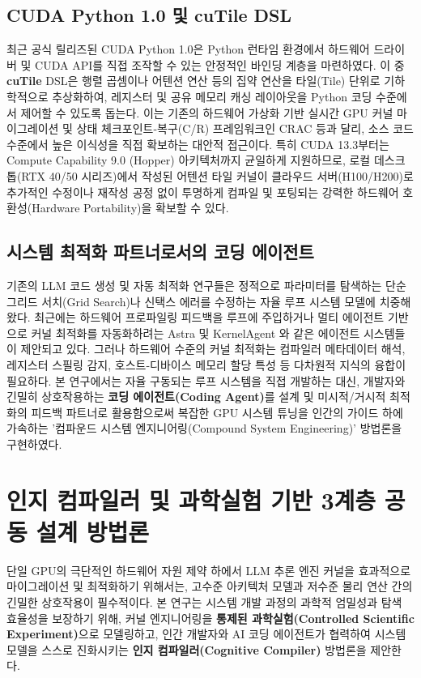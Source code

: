 \documentclass[preprint]{kcc} %
\begin{document}
\subsection{CUDA Python 1.0 및 cuTile DSL}
최근 공식 릴리즈된 CUDA Python 1.0은 Python 런타임 환경에서 하드웨어 드라이버 및 CUDA API를 직접 조작할 수 있는 안정적인 바인딩 계층을 마련하였다. 이 중 \textbf{cuTile} DSL은 행렬 곱셈이나 어텐션 연산 등의 집약 연산을 타일(Tile) 단위로 기하학적으로 추상화하여, 레지스터 및 공유 메모리 캐싱 레이아웃을 Python 코딩 수준에서 제어할 수 있도록 돕는다. 이는 기존의 하드웨어 가상화 기반 실시간 GPU 커널 마이그레이션 및 상태 체크포인트-복구(C/R) 프레임워크인 CRAC 등과 달리, 소스 코드 수준에서 높은 이식성을 직접 확보하는 대안적 접근이다. 특히 CUDA 13.3부터는 Compute Capability 9.0 (Hopper) 아키텍처까지 균일하게 지원하므로, 로컬 데스크톱(RTX 40/50 시리즈)에서 작성된 어텐션 타일 커널이 클라우드 서버(H100/H200)로 추가적인 수정이나 재작성 공정 없이 투명하게 컴파일 및 포팅되는 강력한 하드웨어 호환성(Hardware Portability)을 확보할 수 있다.

\subsection{시스템 최적화 파트너로서의 코딩 에이전트}
기존의 LLM 코드 생성 및 자동 최적화 연구들은 정적으로 파라미터를 탐색하는 단순 그리드 서치(Grid Search)나 신택스 에러를 수정하는 자율 루프 시스템 모델에 치중해 왔다. 최근에는 하드웨어 프로파일링 피드백을 루프에 주입하거나 멀티 에이전트 기반으로 커널 최적화를 자동화하려는 Astra 및 KernelAgent 와 같은 에이전트 시스템들이 제안되고 있다. 그러나 하드웨어 수준의 커널 최적화는 컴파일러 메타데이터 해석, 레지스터 스필링 감지, 호스트-디바이스 메모리 할당 특성 등 다차원적 지식의 융합이 필요하다. 본 연구에서는 자율 구동되는 루프 시스템을 직접 개발하는 대신, 개발자와 긴밀히 상호작용하는 \textbf{코딩 에이전트(Coding Agent)}를 설계 및 미시적/거시적 최적화의 피드백 파트너로 활용함으로써 복잡한 GPU 시스템 튜닝을 인간의 가이드 하에 가속하는 '컴파운드 시스템 엔지니어링(Compound System Engineering)' 방법론을 구현하였다.


\section{인지 컴파일러 및 과학실험 기반 3계층 공동 설계 방법론}
단일 GPU의 극단적인 하드웨어 자원 제약 하에서 LLM 추론 엔진 커널을 효과적으로 마이그레이션 및 최적화하기 위해서는, 고수준 아키텍처 모델과 저수준 물리 연산 간의 긴밀한 상호작용이 필수적이다. 본 연구는 시스템 개발 과정의 과학적 엄밀성과 탐색 효율성을 보장하기 위해, 커널 엔지니어링을 \textbf{통제된 과학실험(Controlled Scientific Experiment)}으로 모델링하고, 인간 개발자와 AI 코딩 에이전트가 협력하여 시스템 모델을 스스로 진화시키는 \textbf{인지 컴파일러(Cognitive Compiler)} 방법론을 제안한다.
\end{document}
